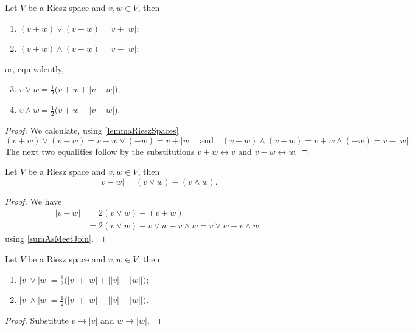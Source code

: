 \begin{lemma} \label{absoluteValueMeetJoin}
Let $V$ be a Riesz space and $v,w\in V$, then
\begin{enumerate}
\item $(v+w)\vee (v-w) = v + |w|$;
\item $(v+w)\wedge (v-w) = v - |w|$;
\end{enumerate}
or, equivalently,
\begin{enumerate} \setcounter{enumi}{2}
\item $v \vee w = \frac{1}{2}\big(v+w + |v - w|\big)$;
\item $v \wedge w = \frac{1}{2}\big(v+w - |v - w|\big)$.
\end{enumerate}
\end{lemma}
\begin{proof}
We calculate, using \ref{lemmaRieszSpaces}
\[ (v+w)\vee (v-w) = v+ w\vee(-w) = v+ |w| \quad\text{and}\quad (v+w)\wedge (v-w) = v + w\wedge(-w) = v-|w|. \]
The next two equalities follow by the substitutions $v+w \leftrightarrow v$ and $v-w \leftrightarrow w$.
\end{proof}
\begin{corollary} \label{absoluteValueDifference}
Let $V$ be a Riesz space and $v,w\in V$, then
\[ |v - w| = (v \vee w) - (v \wedge w). \]
\end{corollary}
\begin{proof}
We have
\begin{align*}
|v-w| &= 2(v\vee w) - (v+w) \\
&= 2(v\vee w) - v\vee w - v \wedge w = v\vee w - v\wedge w.
\end{align*}
using \ref{sumAsMeetJoin}.
\end{proof}
\begin{corollary} \label{meetJoinAbsoluteValues}
Let $V$ be a Riesz space and $v,w\in V$, then
\begin{enumerate}
\item $|v| \vee |w| = \frac{1}{2}\Big(|v|+|w| + \big||v| - |w|\big|\Big)$;
\item $|v| \wedge |w| = \frac{1}{2}\Big(|v|+|w| - \big||v| - |w|\big|\Big)$.
\end{enumerate}
\end{corollary}
\begin{proof}
Substitute $v\to |v|$ and $w\to |w|$.
\end{proof}

